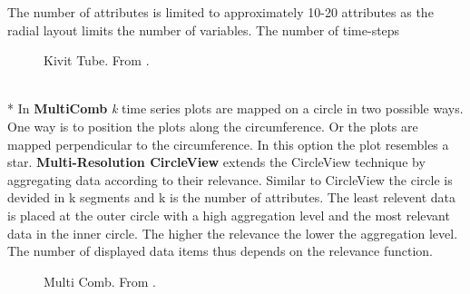 The number of attributes is limited to approximately 10-20 attributes as the radial layout limits the number of variables. The number of time-steps 
\begin{figure}[H]
    \centering
    \caption{Kivit Tube. From \cite{Aigner2011}.}
    \label{fig:kiviattube}
\end{figure}
\\*
In \textbf{MultiComb} \textit{k} time series plots are mapped on a circle in two possible ways. One way is to position the plots along the circumference. Or the plots are mapped perpendicular to the circumference. In this option the plot resembles a star.  
\textbf{Multi-Resolution CircleView} extends the CircleView technique by aggregating data according to their relevance. Similar to CircleView the circle is devided in k segments and k is the number of attributes. The least relevent data is placed at the outer circle with a high aggregation level and the most relevant data in the inner circle. The higher the relevance the lower the aggregation level. The number of displayed data items thus depends on the relevance function. 
\begin{figure}[H]
    \centering
    \caption{Multi Comb. From \cite{Luo2012}.}
    \label{fig:multicomb}
\end{figure}

